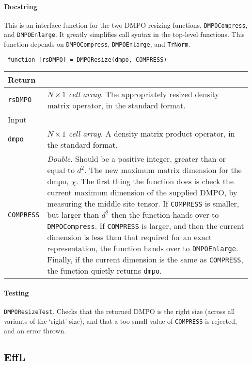  \paragraph{Docstring} This is an interface function for the two DMPO resizing functions, \lstinline$DMPOCompress$, and \lstinline$DMPOEnlarge$. It greatly simplifies call syntax in the top-level functions. This function depends on \lstinline$DMPOCompress$, \lstinline$DMPOEnlarge$, and \lstinline$TrNorm$.
 \begin{lstlisting}
 function [rsDMPO] = DMPOResize(dmpo, COMPRESS) \end{lstlisting}
 \begin{longtabu}{X[1,1]X[4,1]}
 \hline
 Return & \\ \hline
 \lstinline$rsDMPO$ & \emph{\(N \times 1\) cell array}. The appropriately resized density matrix operator, in the standard format. \\ \hline
 Input & \\ \hline
 \lstinline$dmpo$ & \emph{\(N \times 1\) cell array}. A density matrix product operator, in the standard format. \\
 \lstinline$COMPRESS$ & \emph{Double}. Should be a positive integer, greater than or equal to \(d^{2}\). The new maximum matrix dimension for the dmpo, \(\chi\). The first thing the function does is check the current maximum dimension of the supplied DMPO, by measuring the middle site tensor. If \lstinline$COMPRESS$ is smaller, but larger than \(d^{2}\) then the function hands over to \lstinline$DMPOCompress$. If \lstinline$COMPRESS$ is larger, and then the current dimension is less than that required for an exact representation, the function hands over to \lstinline$DMPOEnlarge$. Finally, if the current dimension is the same as \lstinline$COMPRESS$, the function quietly returns \lstinline$dmpo$. \\
 \hline
 \end{longtabu}
 \paragraph{Testing} \lstinline$DMPOResizeTest$. Checks that the returned DMPO is the right size (across all variants of the `right' size), and that a too small value of \lstinline$COMPRESS$ is rejected, and an error thrown.

 \subsection{EffL}
